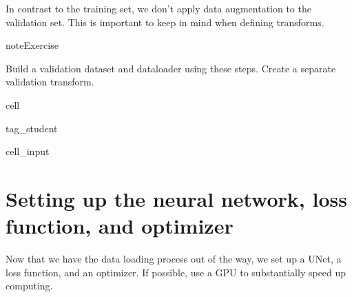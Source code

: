 \documentclass[letterpaper,10pt,english]{jupyterBook}
\begin{document}
\sphinxAtStartPar
In contrast to the training set, we don’t apply data augmentation to the validation set. This is important to keep in mind when defining transforms.

\begin{sphinxadmonition}{note}{Exercise}

\sphinxAtStartPar
Build a validation dataset and dataloader using these steps. Create a separate validation transform.
\end{sphinxadmonition}

\begin{sphinxuseclass}{cell}
\begin{sphinxuseclass}{tag_student}\begin{sphinxVerbatimInput}

\begin{sphinxuseclass}{cell_input}
\begin{sphinxVerbatim}[commandchars=\\\{\}]
\end{sphinxVerbatim}

\end{sphinxuseclass}\end{sphinxVerbatimInput}

\end{sphinxuseclass}
\end{sphinxuseclass}

\section{Setting up the neural network, loss function, and optimizer}
\label{\detokenize{notebooks/Tutorial3_Segmentation/Tutorial3_Segmentation_student:setting-up-the-neural-network-loss-function-and-optimizer}}


\sphinxAtStartPar
Now that we have the data loading process out of the way, we set up a U\sphinxhyphen{}Net, a loss function, and an optimizer. If possible, use a GPU to substantially speed up computing.
\end{document}
